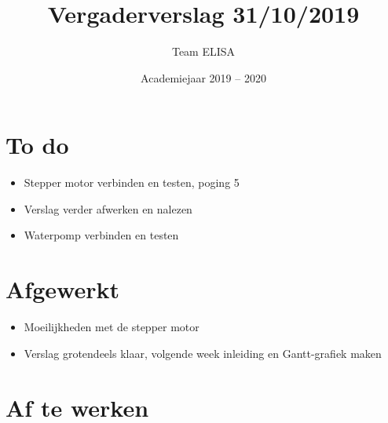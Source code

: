 \documentclass[a4paper,kulak]{kulakarticle} %
\date{Academiejaar 2019 -- 2020}
\title{Vergaderverslag 31/10/2019}
\author{Team ELISA}
\begin{document}
	
	\maketitle
	
	\section*{To do}
	
	\begin{itemize}
		\item Stepper motor verbinden en testen, poging 5
		\item Verslag verder afwerken en nalezen
		\item Waterpomp verbinden en testen
		
	\end{itemize}
	
	\section*{Afgewerkt}
	\begin{itemize}
		\item Moeilijkheden met de stepper motor
		\item Verslag grotendeels klaar, volgende week inleiding en Gantt-grafiek maken
	\end{itemize}
	
	\section*{Af te werken}
	
	
\end{document}
